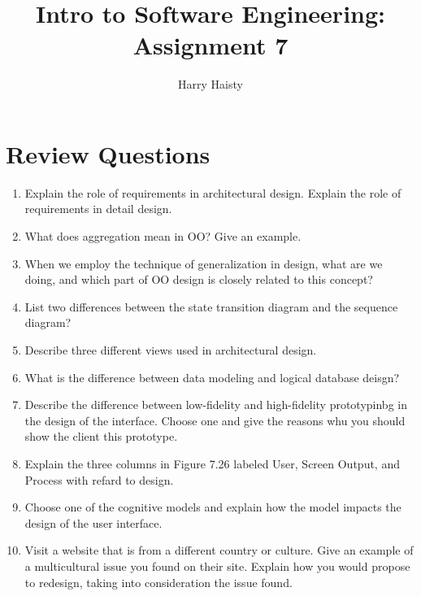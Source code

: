 \documentclass[11pt]{article}
\title{Intro to Software Engineering: Assignment 7}
\author{Harry Haisty}
\begin{document}
    \maketitle
    \section*{Review Questions}
    \begin{enumerate}
    
    \item Explain the role of requirements in architectural design. Explain the role of requirements in detail design. 

    \item What does aggregation mean in OO? Give an example.

    \item When we employ the technique of generalization in design, what are we doing, and which part of OO design is closely related to this concept?

    \item List two differences between the state transition diagram and the sequence diagram?

    \item Describe three different views used in architectural design. 

    \item What is the difference between data modeling and logical database deisgn?

    \item Describe the difference between low-fidelity and high-fidelity prototypinbg in the design of the interface. Choose one and give the reasons whu you should show the client this prototype. 

    \item Explain the three columns in Figure 7.26 labeled User, Screen Output, and Process with refard to design. 

    \item Choose one of the cognitive models and explain how the model impacts the design of the user interface. 

    \item Visit a website that is from a different country or culture. Give an example of a multicultural 
    issue you found on their site. Explain how you would propose to redesign, taking into consideration the issue found. 
    
    \end{enumerate}
    
    
\end{document}
